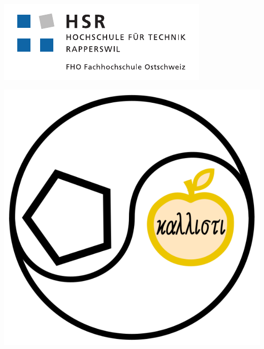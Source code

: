 \begin{titlepage}
\begin{flushleft}

\begin{center}
\begin{minipage}[t]{0.45\textwidth}
  \includegraphics[width=\textwidth]{images/hsr_logo.pdf}
\end{minipage}
\begin{minipage}[t]{0.45\textwidth}
 \includegraphics[width=\textwidth]{images/partner_logo.pdf}
\end{minipage}
\end{center}
\noindent\begin{minipage}[t]{0.49\textwidth}
  \begin{flushleft}
    \vspace{0pt} %
  \end{flushleft}
\end{minipage}
\hfill
\begin{minipage}[t]{0.49\textwidth}
  \begin{flushright}
    \vspace{0pt} %
  \end{flushright}
\end{minipage}
\\[4cm]


\end{flushleft}
\end{titlepage}
